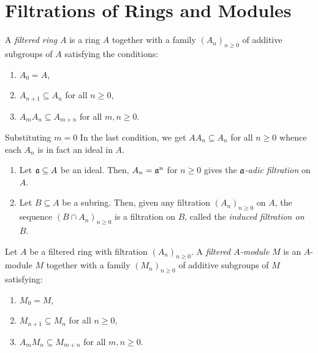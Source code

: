 \section{Filtrations of Rings and Modules}

\begin{definition}
    A \emph{filtered ring} $A$ is a ring $A$ together with a family $(A_n)_{n\ge 0}$ of additive subgroups of $A$ satisfying the conditions: 
    \begin{enumerate}[label=(\alph*)]
        \item $A_0 = A$,
        \item $A_{n + 1}\subseteq A_n$ for all $n\ge 0$,
        \item $A_mA_n\subseteq A_{m + n}$ for all $m,n\ge 0$.
    \end{enumerate}
\end{definition}

Substituting $m = 0$ In the last condition, we get $AA_n\subseteq A_n$ for all $n\ge 0$ whence each $A_n$ is in fact an ideal in $A$.

\begin{example}
\begin{enumerate}[label=(\alph*)]
    \item Let $\mathfrak a\subseteq A$ be an ideal. Then, $A_n = \mathfrak a^n$ for $n\ge 0$ gives the \emph{$\mathfrak a$-adic filtration} on $A$.
    \item Let $B\subseteq A$ be a subring. Then, given any filtration $(A_n)_{n\ge 0}$ on $A$, the sequence $(B\cap A_n)_{n\ge 0}$ is a filtration on $B$, called the \emph{induced filtration on $B$}.
\end{enumerate}
\end{example}

\begin{definition}
    Let $A$ be a filtered ring with filtration $(A_n)_{n\ge 0}$. A \emph{filtered $A$-module} $M$ is an $A$-module $M$ together with a family $(M_n)_{n\ge 0}$ of additive subgroups of $M$ satisfying: 
    \begin{enumerate}[label=(\alph*)]
        \item $M_0 = M$,
        \item $M_{n + 1}\subseteq M_n$ for all $n\ge 0$,
        \item $A_mM_n\subseteq M_{m + n}$ for all $m,n\ge 0$.
    \end{enumerate}
\end{definition}

